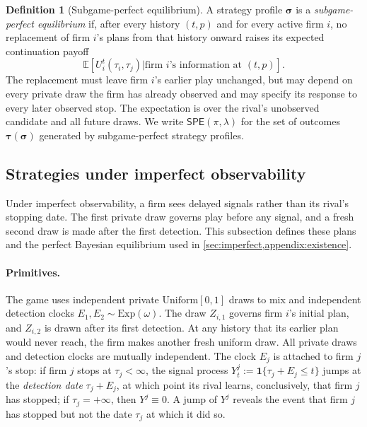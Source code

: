 \documentclass[12pt,reqno]{article}
\newcommand{\Ex}{\mathbb{E}}
\newcommand{\SPE}{\ensuremath{\mathsf{SPE}}}
\theoremstyle{definition} \newtheorem{example}{Example}
\theoremstyle{definition} \newtheorem{condition}{Condition}
\theoremstyle{definition} \newtheorem{corollary}{Corollary}
\theoremstyle{definition} \newtheorem{claim}{Claim}
\theoremstyle{definition} \newtheorem{definition}{Definition}
\theoremstyle{definition} \newtheorem{conjecture}{Conjecture}
\theoremstyle{definition} \newtheorem{Lemma}{Lemma}
\theoremstyle{definition} \newtheorem{lemma}{Lemma}
\theoremstyle{plain} \newtheorem{theorem}{Theorem}
\theoremstyle{definition} \newtheorem{assumption}{Assumption}
\theoremstyle{definition} \newtheorem*{assumptionnonumber}{Assumption}
\theoremstyle{definition} \newtheorem*{theoremNoNumber}{Proposition}
\theoremstyle{definition}
\theoremstyle{definition}\newtheorem{proposition}{Proposition}
\theoremstyle{definition} \newtheorem{result}{Result}
\theoremstyle{definition} \newtheorem*{definitionNoNumber}{Definition}
\theoremstyle{definition} \newtheorem{Definition}{Definition}
\theoremstyle{definition} \newtheorem*{DefinitionNoNumber}{Definition}
\theoremstyle{definition} \newtheorem*{fact}{Fact}
\theoremstyle{definition} \newtheorem*{property}{Property}
\theoremstyle{definition} \newtheorem{remark}{Remark}
\begin{document}
\begin{definition}[Subgame-perfect equilibrium]\label{def:spe}
A strategy profile $\bm\sigma$ is a \emph{subgame-perfect equilibrium} if,
after every history $(t,p)$ and for every active firm $i$, no replacement of
firm $i$'s plans from that history onward raises its expected continuation
payoff
\[
\Ex\!\left[U_i^t(\tau_i,\tau_j)
\mathrel{\big|}\text{firm $i$'s information at $(t,p)$}\right].
\]
The replacement must leave firm $i$'s earlier play unchanged, but may depend
on every private draw the firm has already observed and may specify its
response to every later observed stop. The expectation is over the rival's
unobserved candidate and all future draws. We write $\SPE(\pi,\lambda)$ for
the set of outcomes $\bm\tau(\bm\sigma)$ generated by subgame-perfect
strategy profiles.
\end{definition}



\subsection{Strategies under imperfect observability}\label{app:noisy}


Under imperfect observability, a firm sees delayed signals rather than its rival's stopping date. The first private draw governs play before any signal, and a fresh second draw is made after the first detection. This subsection defines these plans and the perfect Bayesian equilibrium used in \cref{sec:imperfect,appendix:existence}.

\paragraph{Primitives.}
The game uses independent private $\mathrm{Uniform}[0,1]$ draws to mix and independent detection clocks $E_1,E_2\sim\mathrm{Exp}(\omega)$. The draw $Z_{i,1}$ governs firm $i$'s initial plan, and $Z_{i,2}$ is drawn after its first detection. At any history that its earlier plan would never reach, the firm makes another fresh uniform draw. All private draws and detection clocks are mutually independent. The clock $E_j$ is attached to firm $j$'s stop: if firm $j$ stops at $\tau_j<\infty$, the signal process
$
Y^j_t:=\mathbf 1\{\tau_j+E_j\le t\}$
jumps at the \emph{detection date} $\tau_j+E_j$, at which point its rival learns, conclusively, that firm $j$ has stopped; if $\tau_j=+\infty$, then $Y^j\equiv0$. A jump of $Y^j$ reveals the event that firm $j$ has stopped but not the date $\tau_j$ at which it did so.
\end{document}
